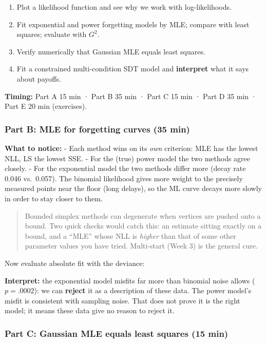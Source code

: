 \begin{enumerate}
\def\labelenumi{\arabic{enumi}.}
\tightlist
\item
  Plot a likelihood function and see why we work with log-likelihoods.
\item
  Fit exponential and power forgetting models by MLE; compare with least
  squares; evaluate with \(G^2\).
\item
  Verify numerically that Gaussian MLE equals least squares.
\item
  Fit a constrained multi-condition SDT model and \textbf{interpret}
  what it says about payoffs.
\end{enumerate}

\textbf{Timing:} Part A 15 min · Part B 35 min · Part C 15 min · Part D
35 min · Part E 20 min (exercises).

\subsubsection{Part B: MLE for forgetting curves (35 min)}

\textbf{What to notice:} - Each method wins on its \emph{own} criterion:
MLE has the lowest NLL, LS the lowest SSE. - For the (true) power model
the two methods agree closely. - For the exponential model the two
methods differ more (decay rate 0.046 vs.~0.057). The binomial
likelihood gives more weight to the precisely measured points near the
floor (long delays), so the ML curve decays more slowly in order to stay
closer to them.

\begin{quote}
Bounded simplex methods can degenerate when vertices are pushed onto a
bound. Two quick checks would catch this: an estimate sitting exactly on
a bound, and a ``MLE'' whose NLL is \emph{higher} than that of some
other parameter values you have tried. Multi-start (Week 3) is the
general cure.
\end{quote}

Now evaluate absolute fit with the deviance:

\textbf{Interpret:} the exponential model misfits far more than binomial
noise allows (\(p = .0002\)): we can \textbf{reject} it as a description
of these data. The power model's misfit is consistent with sampling
noise. That does not prove it is the right model; it means these data
give no reason to reject it.

\subsubsection{Part C: Gaussian MLE equals least squares (15 min)}

